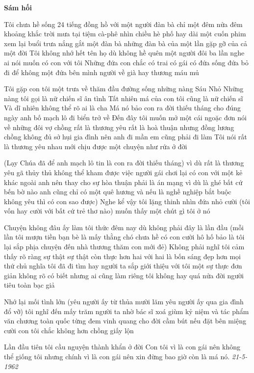 \documentclass[../main.tex]{subfiles}
\begin{document}
\begin{multicols}{2}
 
\textbf{Sám hối} 
 
Tôi chưa hề sống 24 tiếng đồng hồ với một người đàn bà 
chỉ một đêm 
nửa đêm 
khoảng khắc trời mưa tại tiệm cà-phê nhìn chiều hè phố 
hay dài một cuốn phim 
xem lại buổi trưa nắng gắt 
một đàn bà 
những đàn bà 
của một lần gặp gỡ 
của cả một đời 
Tôi không nhớ hết tên họ dù không hề quên một người 
đôi ba lần nghe ai nói muốn có con với tôi 
Những đứa con 
chắc có trai có gái 
có đứa sống đứa bỏ đi 
để không một đứa bên mình 
người về già hay thương máu mủ 
 
Tôi gặp con tôi một trưa về thăm đầu đường sống 
những nàng Sáu Nhỏ 
Những nàng tôi gọi là nữ chiến sĩ ân tình 
Tất nhiên má của con tôi cũng là nữ chiến sĩ 
Và dĩ nhiên không thể rõ ai là cha 
Má nó bảo con ra đời thiếu tháng 
cho đúng ngày anh bố mạch lô đi biển trở về 
Đến đây tôi muốn mở một cái ngoặc đơn 
nói về những đôi vợ chồng rất là thương yêu rất là hoà thuận 
nhưng đồng lương chồng không đủ sở hụi gia đình 
nên anh đi mần 
em cũng phải đi làm 
Tôi nói rất là thương yêu nhau mới chịu được một chuyện như rứa ở đời        
 
(Lạy Chúa đã để anh mạch lô tin là con ra đời thiếu tháng) 
vì dù rất là thương yêu  
gã thủy thủ không thể kham được việc người gái chơi lại có con với một kẻ khác ngoài anh 
nên thay cho sự hòa thuận 
phải là án mạng 
vì dù là ghé bất cứ bến bờ nào 
anh cũng chỉ có một quê hương 
và nếu là nghề nghiệp bắt buộc 
không yêu thì có con sao được) 
Nghe kể vậy tôi lặng thinh nhìn 
đứa nhỏ cười  
(tôi vốn hay cười với bất cứ trẻ thơ nào) 
muốn thấy một chút gì tôi ở nó 
 
Chuyện không đâu ấy làm tôi thức đêm nay 
dù không phải đây là lần đầu 
(mỗi lần tôi mượn tiền bạn bè là mấy thằng chó chưa hề có con cười hô hố bảo là tôi lại sắp phịa chuyện đến nhà thương thăm con mới đẻ) 
Không phải nghĩ tôi cảm thấy rõ ràng sự thật  
sự thật còn thực hơn hai với hai là bốn 
sáng đẹp hơn mọi thứ chủ nghĩa tôi đã đi tìm hay người ta sắp giới thiệu với tôi 
một sự thực đơn giản không rõ có biết nhưng ai cũng làm 
riêng tôi không hay quá nửa đời người tiêu toàn bạc giả 
 
Nhớ lại mối tình lớn  
(yêu người ấy từ thủa mười lăm 
yêu người ấy qua gia đình đổ vỡ) 
tôi nghĩ đến mấy trăm người ta nhờ bác sĩ xoá giùm kỷ niệm 
và tác phẩm văn chương toàn quốc từng đem vinh quang cho đời cầm bút 
nếu đặt bên miệng cười con tôi 
chắc không hơn chồng giấy lộn 
 
Lần đầu tiên tôi cầu nguyện thành khẩn ở đời 
Con tôi vì là con gái nên không thể giống tôi 
nhưng chính vì là con gái nên xin đừng bao giờ còn là má nó.        
\textit{21-5-1962}        
 

\end{multicols}
\end{document}
